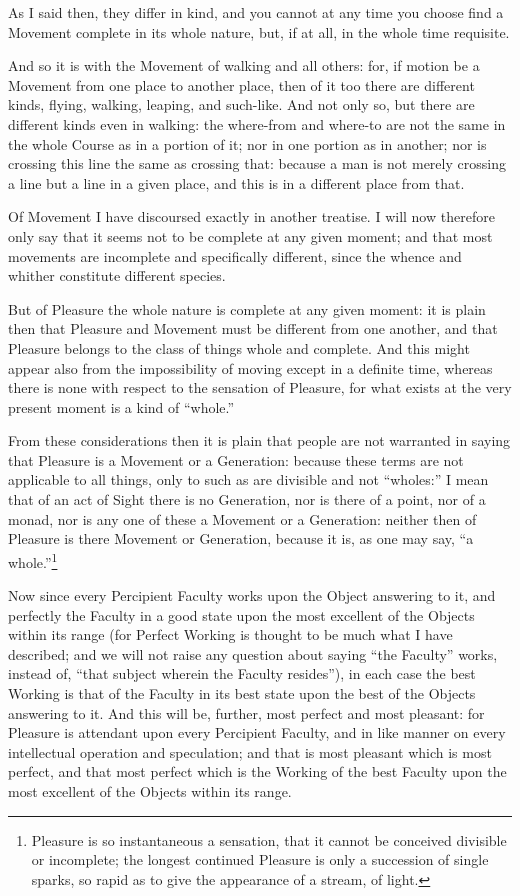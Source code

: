 As I said then, they differ in kind, and you cannot at any time you choose find
a Movement complete in its whole nature, but, if at all, in the whole time
requisite.

And so it is with the Movement of walking and all others: for, if motion be a
Movement from one place to another place, then of it too there are different
kinds, flying, walking, leaping, and such-like. And not only so, but there are
different kinds even in walking: the where-from and where-to are not the same
in the whole Course as in a portion of it; nor in one portion as in another;
nor is crossing this line the same as crossing that: because a man is not
merely crossing a line but a line in a given place, and this is in a different
place from that.

Of Movement I have discoursed exactly in another treatise. I will now therefore
only say that it seems not to be complete at any given moment; and that most
movements are incomplete and specifically different, since the whence and
whither constitute different species.

But of Pleasure the whole nature is complete at any given moment: it is plain
then that Pleasure and Movement must be different from one another, and that
Pleasure belongs to the class of things whole and complete. And this might
appear also from the impossibility of moving except in a definite time, whereas
there is none with respect to the sensation of Pleasure, for what exists at the
very present moment is a kind of “whole.”

From these considerations then it is plain that people are not warranted in
saying that Pleasure is a Movement or a Generation: because these terms are not
applicable to all things, only to such as are divisible and not
“wholes:” I mean that of an act of Sight there is no Generation,
nor is there of a point, nor of a monad, nor is any one of these a Movement or
a Generation: neither then of Pleasure is there Movement or Generation, because
it is, as one may say,
“a whole.”\footnote{Pleasure is so instantaneous a sensation, that it cannot be conceived divisible
or incomplete; the longest continued Pleasure is only a succession of single
sparks, so rapid as to give the appearance of a stream, of light.}


Now since every Percipient Faculty works upon the Object answering to it, and
perfectly the Faculty in a good state upon the most excellent of the Objects
within its range (for Perfect Working is thought to be much what I have
described; and we will not raise any question about saying “the
Faculty” works, instead of, “that subject wherein the Faculty
resides”), in each case the best Working is that of the Faculty in its
best state upon the best of the Objects answering to it. And this will be,
further, most perfect and most pleasant: for Pleasure is attendant upon every
Percipient Faculty, and in like manner on every intellectual operation and
speculation; and that is most pleasant which is most perfect, and that most
perfect which is the Working of the best Faculty upon the most excellent of the
Objects within its range.

